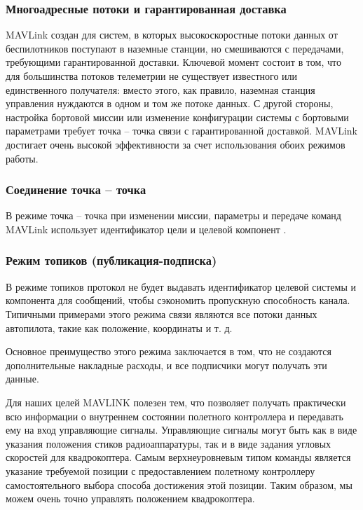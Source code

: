 \subsubsection{Многоадресные потоки и гарантированная доставка}
MAVLink создан для систем, в которых высокоскоростные потоки данных от беспилотников поступают в наземные станции, но смешиваются с передачами, требующими гарантированной доставки. Ключевой момент состоит в том, что для большинства потоков телеметрии не существует известного или единственного получателя: вместо этого, как правило, наземная станция управления нуждаются в одном и том же потоке данных.
С другой стороны, настройка бортовой миссии или изменение конфигурации системы с бортовыми параметрами требует точка -- точка связи с гарантированной доставкой. MAVLink достигает очень высокой эффективности за счет использования обоих режимов работы.

\subsubsection{Соединение точка -- точка}
В режиме точка -- точка при изменении миссии, параметры и передаче команд MAV\-Link использует идентификатор цели и целевой компонент \cite{mavlink}.

\subsubsection{Режим топиков (публикация-подписка)}
В режиме топиков протокол не будет выдавать идентификатор целевой системы и компонента для сообщений, чтобы сэкономить пропускную способность канала. Типичными примерами этого режима связи являются все потоки данных автопилота, такие как положение, координаты и т. д.

Основное преимущество этого режима заключается в том, что не создаются дополнительные накладные расходы, и все подписчики могут получать эти данные.

Для наших целей MAVLINK полезен тем, что позволяет получать практически всю информации о внутреннем состоянии полетного контроллера и передавать ему на вход управляющие сигналы. Управляющие сигналы могут быть как в виде указания положения стиков радиоаппаратуры, так и в виде задания угловых скоростей для квадрокоптера. Самым верхнеуровневым типом команды является указание требуемой позиции с предоставлением полетному контроллеру самостоятельного выбора способа достижения этой позиции. Таким образом, мы можем очень точно управлять положением квадрокоптера.

